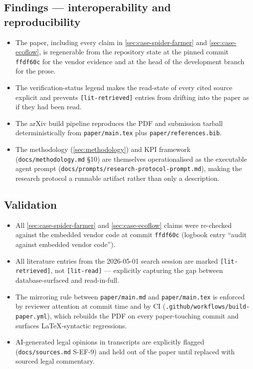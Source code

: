 \documentclass[11pt,a4paper]{article}
\begin{document}
\subsection{Findings --- interoperability and reproducibility}
\label{sec:meta-interop}
\begin{itemize}
  \item The paper, including every claim in \cref{sec:case-spider-farmer}
        and \cref{sec:case-ecoflow}, is regenerable from the repository
        state at the pinned commit \texttt{ffdf60c} for the vendor evidence
        and at the head of the development branch for the prose.
  \item The verification-status legend makes the read-state of every cited
        source explicit and prevents \texttt{[lit-retrieved]} entries from
        drifting into the paper as if they had been read.
  \item The arXiv build pipeline reproduces the PDF and submission tarball
        deterministically from \texttt{paper/main.tex} plus
        \texttt{paper/references.bib}.
  \item The methodology (\cref{sec:methodology}) and KPI framework
        (\texttt{docs/methodology.md} \S 10) are themselves operationalised
        as the executable agent prompt
        (\texttt{docs/prompts/research-protocol-prompt.md}), making the research
        protocol a runnable artifact rather than only a description.
\end{itemize}

\subsection{Validation}
\label{sec:meta-validation}
\begin{itemize}
  \item All \cref{sec:case-spider-farmer} and
        \cref{sec:case-ecoflow} claims were re-checked against the embedded
        vendor code at commit \texttt{ffdf60c} (logbook entry ``audit
        against embedded vendor code'').
  \item All literature entries from the 2026-05-01 search session are
        marked \texttt{[lit-retrieved]}, not \texttt{[lit-read]} ---
        explicitly capturing the gap between database-surfaced and
        read-in-full.
  \item The mirroring rule between \texttt{paper/main.md} and
        \texttt{paper/main.tex} is enforced by reviewer attention at
        commit time and by CI
        (\texttt{.github/workflows/build-paper.yml}), which rebuilds the
        PDF on every paper-touching commit and surfaces LaTeX-syntactic
        regressions.
  \item AI-generated legal opinions in transcripts are explicitly flagged
        (\texttt{docs/sources.md} S-EF-9) and held out of the paper until
        replaced with sourced legal commentary.
\end{itemize}
\end{document}
